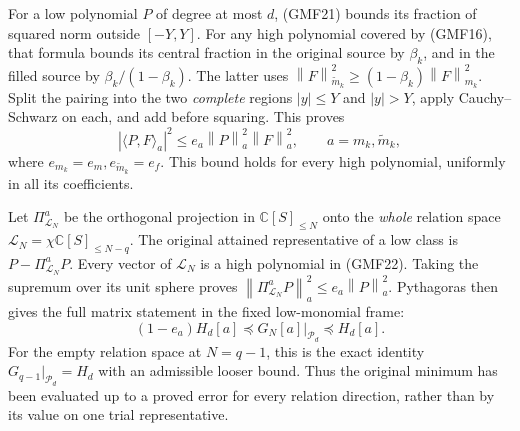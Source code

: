 \documentclass[11pt]{article}
\newcommand{\C}{\mathbb C}
\newcommand{\PP}{\mathcal P}
\newcommand{\norm}[1]{\left\lVert#1\right\rVert}
\begin{document}
For a low polynomial \(P\) of degree at most \(d\), (GMF21)
bounds its fraction of squared norm outside \([-Y,Y]\).
For any high polynomial covered by (GMF16), that formula
bounds its central fraction in the original source by
\(\beta_k\), and in the filled source by
\(\beta_k/(1-\beta_k)\).
The latter uses
\(\norm F_{\widetilde m_k}^2\ge(1-\beta_k)\norm F_{m_k}^2\).
Split the pairing into the two \emph{complete} regions
\(|y|\le Y\) and \(|y|>Y\), apply Cauchy--Schwarz on each,
and add before squaring.  This proves
\begin{equation}\tag{GMF22}
 |\langle P,F\rangle_a|^2
 \le e_a\norm P_a^2\norm F_a^2,\qquad
 a=m_k,\widetilde m_k,
\end{equation}
where \(e_{m_k}=e_m,e_{\widetilde m_k}=e_f\).
This bound holds for every high polynomial, uniformly in all
its coefficients.

Let \(\Pi_{\mathcal L_N}^a\) be the orthogonal projection in
\(\C[S]_{\le N}\) onto the \emph{whole} relation space
\(\mathcal L_N=\chi\C[S]_{\le N-q}\).
The original attained representative of a low class is
\(P-\Pi_{\mathcal L_N}^aP\).
Every vector of \(\mathcal L_N\) is a high polynomial in
(GMF22).  Taking the supremum over its unit sphere proves
\(\norm{\Pi_{\mathcal L_N}^aP}_a^2\le e_a\norm P_a^2\).
Pythagoras then gives the full matrix statement in the
fixed low-monomial frame:
\begin{equation}\tag{GMF23}
 (1-e_a)H_d[a]\preceq G_N[a]\big|_{\PP_d}
                         \preceq H_d[a].
\end{equation}
For the empty relation space at \(N=q-1\), this is the
exact identity \(G_{q-1}|_{\PP_d}=H_d\) with an admissible
looser bound.  Thus the original minimum has been evaluated
up to a proved error for every relation direction, rather
than by its value on one trial representative.
\end{document}
